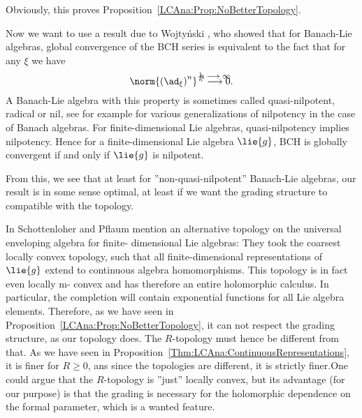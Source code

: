 Obviously, this proves Proposition~\ref{LCAna:Prop:NoBetterTopology}.


Now we want to use a result due to Wojty\'nski \cite{wojtynski:2000a}, who 
showed that for Banach-Lie algebras, global convergence of the BCH series is 
equivalent to the fact that for any $\xi$ we have
\begin{equation*}
	\norm{ 
		\left( \ad_{\xi} \right)^n 
	}^{\frac{1}{n}}
	\ot{$n \longrightarrow \infty$}{\longrightarrow}
	0.
\end{equation*}
A Banach-Lie algebra with this property is sometimes called quasi-nilpotent, 
radical or nil, see for example \cite{mueller:2000a} for various 
generalizations of nilpotency in the case of Banach algebras.
For finite-dimensional Lie algebras, quasi-nilpotency implies nilpotency. 
Hence for a finite-dimensional Lie algebra $\lie{g}$, BCH is globally 
convergent if and only if $\lie{g}$ is nilpotent.


From this, we see that at least for ''non-quasi-nilpotent'' Banach-Lie 
algebras, our result is in some sense optimal, at least if we want the grading 
structure to compatible with the topology.
\begin{remark}
    \label{Rem:LCAnaBCHConvergence}
    In \cite{pflaum.schottenloher:1998a} Schottenloher and Pflaum mention an 
    alternative topology on the universal enveloping algebra for finite-
    dimensional Lie algebras: They took the coarsest locally convex topology, 
    such that all finite-dimensional representations of $\lie{g}$ extend to 
    continuous algebra homomorphisms. This topology is in fact even locally m-
    convex and has therefore an entire holomorphic calculus. In particular, 
    the completion will contain exponential functions for all Lie algebra 
    elements. Therefore, as we have seen in 
    Proposition~\ref{LCAna:Prop:NoBetterTopology}, it can not respect the 
    grading structure, as our topology does. The $R$-topology must hence be 
    different from that. As we have seen in 
    Proposition~\ref{Thm:LCAna:ContinuousRepresentations}, it is finer for 
    $R \geq 0$, ans since the topologies are different, it is strictly 
    finer.One could argue that the $R$-topology is ''just'' locally convex, 
    but its advantage (for our purpose) is that the grading is necessary for 
    the holomorphic dependence on the formal parameter, which is a wanted 
    feature.
\end{remark}
